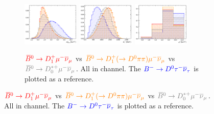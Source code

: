 \begin{figure}[!htb]
    \begin{subfigure}{\textwidth}
        \centering
        \includegraphics[width=0.3\textwidth]{figs-fit-fit-templates/histo-comp/D0_iso_D0Tau__vs__D0_iso_D1ststMu__vs__D0_iso_D1ststMuD0PiPi__vs__D0_iso_D0ststMu__m2miss.pdf}
        \includegraphics[width=0.3\textwidth]{figs-fit-fit-templates/histo-comp/D0_iso_D0Tau__vs__D0_iso_D1ststMu__vs__D0_iso_D1ststMuD0PiPi__vs__D0_iso_D0ststMu__el.pdf}
        \includegraphics[width=0.3\textwidth]{figs-fit-fit-templates/histo-comp/D0_iso_D0Tau__vs__D0_iso_D1ststMu__vs__D0_iso_D1ststMuD0PiPi__vs__D0_iso_D0ststMu__q2.pdf}
        \caption{
            $\textcolor{red}{{{\kern 0.18em\overline{\kern -0.18em B}}{}^0} \rightarrow {\ensuremath{D}}_1^+{\mu^-}{{\overline{\nu}}_\mu}}$
            vs
            $\textcolor{orange}{{{\kern 0.18em\overline{\kern -0.18em B}}{}^0} \rightarrow {\ensuremath{D}}_1^+ (\rightarrow {\ensuremath{{D}^0}}\pi\pi) {\mu^-}{{\overline{\nu}}_\mu}}$
            vs
            $\textcolor{gray}{\Bzb \rightarrow \D_0^{*+}\mun\neumb}$.
            All in \Dz channel.
            The $\textcolor{blue}{{{{B}^-}} \rightarrow {\ensuremath{{D}^0}}{\ensuremath{\tau^-}}{\ensuremath{{\overline{\nu}}_\tau}}}$ is plotted
            as a reference.
        }
    \end{subfigure}



\end{figure}
